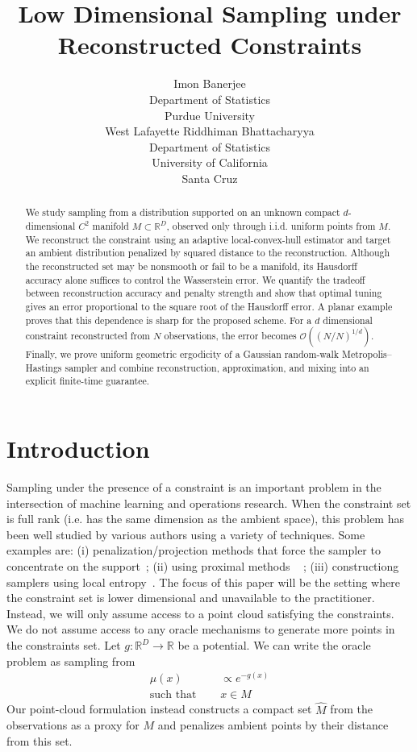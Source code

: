 \documentclass{article}
\title{Low Dimensional Sampling under Reconstructed Constraints}
\author{
  Imon Banerjee\\
  Department of Statistics\\
  Purdue University\\
  West Lafayette
  \And
  Riddhiman Bhattacharyya\\
  Department of Statistics\\
  University of California\\ Santa Cruz
}
\numberwithin{equation}{section}
\newcommand{\Rbb}{\mathbb{R}}
\begin{document}
\maketitle

\begin{abstract}
We study sampling from a distribution supported on an unknown compact $d$-dimensional $C^2$ manifold $M\subset\mathbb{R}^D$, observed only through i.i.d. uniform points from $M$. We reconstruct the constraint using an adaptive local-convex-hull estimator and target an ambient distribution penalized by squared distance to the reconstruction. Although the reconstructed set may be nonsmooth or fail to be a manifold, its Hausdorff accuracy alone suffices to control the Wasserstein error. We quantify the tradeoff between reconstruction accuracy and penalty strength and show that optimal tuning gives an error proportional to the square root of the Hausdorff error. A planar example proves that this dependence is sharp for the proposed scheme. For a $d$ dimensional constraint reconstructed from $N$ observations, the error becomes $\mathcal{O}( (N/N)^{1/d})$. Finally, we prove uniform geometric ergodicity of a Gaussian random-walk Metropolis--Hastings sampler and combine reconstruction, approximation, and mixing into an explicit finite-time guarantee.
\end{abstract}

\section{Introduction}

Sampling under the presence of a constraint is an important problem in the intersection of machine learning and operations research. When the constraint set is full rank (i.e. has the same dimension as the ambient space), this problem has been well studied by various authors using a variety of techniques. Some examples are: (i) penalization/projection methods that force the sampler to concentrate on the support~\citep{brosse2017proximal,bubeck2018projected}; (ii) using proximal methods ~\citep{chen2022proximal, pmlr-v134-lee21a} ; (iii) constructiong samplers using local entropy~\citep{mohanty2025entropyguidedsamplingflatmodes}. The focus of this paper will be the setting where the constraint set is lower dimensional and unavailable to the practitioner. Instead, we will only assume access to a point cloud satisfying the constraints. We do not assume access to any oracle mechanisms to generate more points in the constraints set. Let $g:\Rbb^D\rightarrow \Rbb$ be a potential. We can write the oracle problem as sampling from
\begin{align*}
 \mu(x)\ & \propto  e^{-g(x)}\\
\text{such that }\quad  & x\in M    \label{eq:oracle_problem} \tag{Oracle Problem}
\end{align*}
Our point-cloud formulation instead constructs a compact set $\widehat M$
from the observations as a proxy for $M$ and penalizes ambient points by
their distance from this set.
\end{document}
